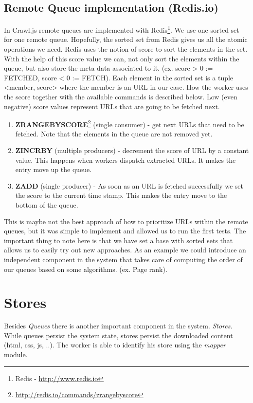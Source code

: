 \subsection{Remote Queue implementation (Redis.io)}
In Crawl.js remote queues are implemented with Redis\footnote{Redis - \url{http://www.redis.io}}. We use one sorted set for one remote queue. Hopefully, the sorted set from Redis gives us all the atomic operations we need. Redis uses the notion of score to sort the elements in the set. With the help of this score value we can, not only sort the elements within the queue, but also store the meta data associated to it. (ex. score > 0 := FETCHED, score < 0 := FETCH). Each element in the sorted set is a tuple <member, score> where the member is an URL in our case. How the worker uses the score together with the available commands is described below. Low (even negative) score values represent URLs that are going to be fetched next.

\begin{enumerate}
  \item \textbf{ZRANGEBYSCORE}\footnote{\url{http://redis.io/commands/zrangebyscore}} (single consumer) - get next URLs that need to be fetched. Note that the elements in the queue are not removed yet.
  \item \textbf{ZINCRBY} (multiple producers) - decrement the score of URL by a constant value. This happens when workers dispatch extracted URLs. It makes the entry move up the queue.
  \item \textbf{ZADD} (single producer) - As soon as an URL is fetched successfully we set the score to the current time stamp. This makes the entry move to the bottom of the queue.
\end{enumerate}

This is maybe not the best approach of how to prioritize URLs within the remote queues, but it was simple to implement and allowed us to run the first tests. The important thing to note here is that we have set a base with sorted sets that allows us to easily try out new approaches. As an example we could introduce an independent component in the system that takes care of computing the order of our queues based on some algorithms. (ex. Page rank).

\section{Stores}
Besides \emph{Queues} there is another important component in the system. \emph{Stores}. While queues persist the system state, stores persist the downloaded content (html, css, js, ..). The worker is able to identify his store using the \emph{mapper} module.
